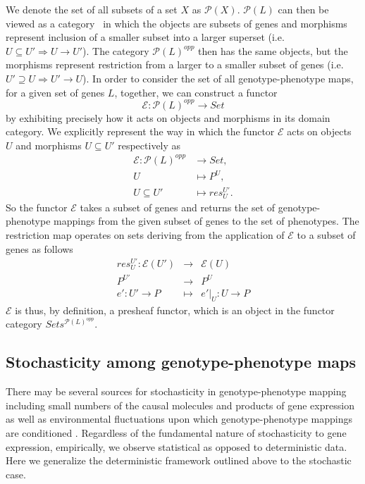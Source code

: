 We denote the set of all subsets of a set $X$ as $\mathcal{P}(X)$. $\mathcal{P}(L)$ can then be viewed as a category~\cite{Lane1998,MacLane1992,Awodey2006} in which the objects are subsets of genes and morphisms represent inclusion of a smaller subset into a larger superset (i.e. $U \subseteq U' \Rightarrow U \rightarrow U'$). The category $\mathcal{P}(L)^{opp}$ then has the same objects, but the morphisms represent restriction from a larger to a smaller subset of genes (i.e. $U' \supseteq U \Rightarrow U' \rightarrow U$). In order to consider the set of all genotype-phenotype maps, for a given set of genes $L$, together, we can construct a functor
$$
\mathcal{E} \colon \mathcal{P}(L)^{opp} \rightarrow Set
$$
by exhibiting precisely how it acts on objects and morphisms in its domain category. We explicitly represent the way in which the functor $\mathcal{E}$ acts on objects $U$ and morphisms $U \subseteq U'$ respectively as
\begin{equation}\label{eq:gpfunctor}
\begin{split}
\mathcal{E} \colon \mathcal{P}(L)^{opp} &\rightarrow Set,\\
U &\mapsto P^U,\\
U \subseteq U' &\mapsto res^{U'}_{U}.
\end{split}
\end{equation}
So the functor $\mathcal{E}$ takes a subset of genes and returns the set of genotype-phenotype mappings from the given subset of genes to the set of phenotypes. The restriction map operates on sets deriving from the application of $\mathcal{E}$ to a subset of genes as follows
\begin{eqnarray*}
res^{U'}_{U} \colon \mathcal{E}(U') &\rightarrow& \mathcal{E}(U)\\
P^{U'} &\rightarrow& P^U\\
e' \colon U' \rightarrow P &\mapsto& e'|_U \colon U \rightarrow P
\end{eqnarray*}
$\mathcal{E}$ is thus, by definition, a presheaf functor, which is an object in the functor category $Sets^{\mathcal{P}(L)^{opp}}$.

\subsection{Stochasticity among genotype-phenotype maps}
There may be several sources for stochasticity in genotype-phenotype mapping including small numbers of the causal molecules and products of gene expression as well as environmental fluctuations upon which genotype-phenotype mappings are conditioned \cite{Swain2002,Paulsson2004,Thattai2004,Acar2008a,Lestas2010,Munsky2012,Chalancon2012,Neuert2013,Sanchez2013}. Regardless of the fundamental nature of stochasticity to gene expression, empirically, we observe statistical as opposed to deterministic data. Here we generalize the deterministic framework outlined above to the stochastic case.

